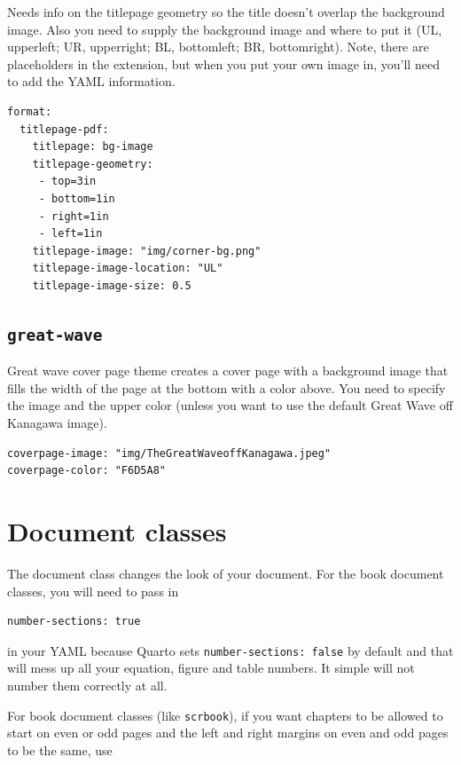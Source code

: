 \documentclass[
  oneside,
  open=any]{scrbook}
\begin{document}
Needs info on the titlepage geometry so the title doesn't overlap the
background image. Also you need to supply the background image and where
to put it (UL, upperleft; UR, upperright; BL, bottomleft; BR,
bottomright). Note, there are placeholders in the extension, but when
you put your own image in, you'll need to add the YAML information.

\begin{verbatim}
format: 
  titlepage-pdf:
    titlepage: bg-image
    titlepage-geometry: 
     - top=3in
     - bottom=1in
     - right=1in
     - left=1in
    titlepage-image: "img/corner-bg.png"
    titlepage-image-location: "UL"
    titlepage-image-size: 0.5
\end{verbatim}

\hypertarget{great-wave}{%
\subsection{\texorpdfstring{\texttt{great-wave}}{great-wave}}\label{great-wave}}

Great wave cover page theme creates a cover page with a background image
that fills the width of the page at the bottom with a color above. You
need to specify the image and the upper color (unless you want to use
the default Great Wave off Kanagawa image).

\begin{verbatim}
coverpage-image: "img/TheGreatWaveoffKanagawa.jpeg"
coverpage-color: "F6D5A8"
\end{verbatim}

\hypertarget{document-classes}{%
\section{Document classes}\label{document-classes}}

The document class changes the look of your document. For the book
document classes, you will need to pass in

\begin{verbatim}
number-sections: true
\end{verbatim}

in your YAML because Quarto sets \texttt{number-sections:\ false} by
default and that will mess up all your equation, figure and table
numbers. It simple will not number them correctly at all.

For book document classes (like \texttt{scrbook}), if you want chapters
to be allowed to start on even or odd pages and the left and right
margins on even and odd pages to be the same, use
\end{document}
